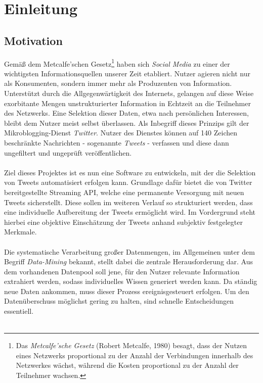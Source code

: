 \chapter{Einleitung}
\section{Motivation}
Gemäß dem Metcalfe'schen Gesetz\footnote{Das \textit{Metcalfe'sche Gesetz} (Robert Metcalfe, 1980) besagt, dass der Nutzen eines Netzwerks proportional zu der Anzahl der Verbindungen innerhalb des Netzwerkes wächst, während die Kosten proportional zu der Anzahl der Teilnehmer wachsen.} haben sich \textit{Social Media} zu einer der wichtigsten Informationsquellen unserer Zeit etabliert. Nutzer agieren nicht nur als Konsumenten, sondern immer mehr als Produzenten von Information. Unterstützt durch die Allgegenwärtigkeit des Internets, gelangen auf diese Weise exorbitante Mengen unstrukturierter Information in Echtzeit an die Teilnehmer des Netzwerks. Eine Selektion dieser Daten, etwa nach persönlichen Interessen, bleibt dem Nutzer meist selbst überlassen.
Als Inbegriff dieses Prinzips gilt der Mikroblogging-Dienst \textit{Twitter}. Nutzer des Dienstes können auf 140 Zeichen beschränkte Nachrichten - sogenannte \textit{Tweets} - verfassen und diese dann ungefiltert und ungeprüft veröffentlichen.\\\\
Ziel dieses Projektes ist es nun eine Software zu entwickeln, mit der die Selektion von Tweets automatisiert erfolgen kann. Grundlage dafür bietet die von Twitter bereitgestellte Streaming API, welche eine permanente Versorgung mit neuen Tweets sicherstellt. Diese sollen im weiteren Verlauf so strukturiert werden, dass eine individuelle Aufbereitung der Tweets ermöglicht wird. Im Vordergrund steht hierbei eine objektive Einschätzung der Tweets anhand subjektiv festgelegter Merkmale.\\\\
Die systematische Verarbeitung großer Datenmengen, im Allgemeinen unter dem Begriff \textit{Data-Mining} bekannt, stellt dabei die zentrale Herausforderung dar. Aus dem vorhandenen Datenpool soll jene, für den Nutzer relevante Information extrahiert werden, sodass individuelles Wissen generiert werden kann. Da ständig neue Daten ankommen, muss dieser Prozess ereignisgesteuert erfolgen. Um den Datenüberschuss möglichst gering zu halten, sind schnelle Entscheidungen essentiell. \\\\
